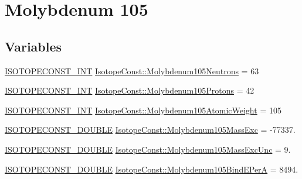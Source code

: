 \hypertarget{group___isotope_const-_molybdenum-_mo105}{}\section{Molybdenum 105}
\label{group___isotope_const-_molybdenum-_mo105}
\subsection*{Variables}
\begin{DoxyCompactItemize}
\item 
\mbox{\hyperlink{group___isotope_const-_macros_ga5f18360b3e99483a35c32d789e62621c}{I\+S\+O\+T\+O\+P\+E\+C\+O\+N\+S\+T\+\_\+\+I\+NT}} \mbox{\hyperlink{group___isotope_const-_molybdenum-_mo105_ga3ea2c4b0deecf579116e89594a15c6d9}{Isotope\+Const\+::\+Molybdenum105\+Neutrons}} = 63
\item 
\mbox{\hyperlink{group___isotope_const-_macros_ga5f18360b3e99483a35c32d789e62621c}{I\+S\+O\+T\+O\+P\+E\+C\+O\+N\+S\+T\+\_\+\+I\+NT}} \mbox{\hyperlink{group___isotope_const-_molybdenum-_mo105_ga86666d6ff3253ab33c90601b8abe2ebc}{Isotope\+Const\+::\+Molybdenum105\+Protons}} = 42
\item 
\mbox{\hyperlink{group___isotope_const-_macros_ga5f18360b3e99483a35c32d789e62621c}{I\+S\+O\+T\+O\+P\+E\+C\+O\+N\+S\+T\+\_\+\+I\+NT}} \mbox{\hyperlink{group___isotope_const-_molybdenum-_mo105_gab3e9d7db3d391be26681299f3b67ff0d}{Isotope\+Const\+::\+Molybdenum105\+Atomic\+Weight}} = 105
\item 
\mbox{\hyperlink{group___isotope_const-_macros_ga8f45a7272ce02c0b4c65c44636ed719a}{I\+S\+O\+T\+O\+P\+E\+C\+O\+N\+S\+T\+\_\+\+D\+O\+U\+B\+LE}} \mbox{\hyperlink{group___isotope_const-_molybdenum-_mo105_gad3b467cfc52f7b343b37881da8b0702d}{Isotope\+Const\+::\+Molybdenum105\+Mass\+Exc}} = -\/77337.
\item 
\mbox{\hyperlink{group___isotope_const-_macros_ga8f45a7272ce02c0b4c65c44636ed719a}{I\+S\+O\+T\+O\+P\+E\+C\+O\+N\+S\+T\+\_\+\+D\+O\+U\+B\+LE}} \mbox{\hyperlink{group___isotope_const-_molybdenum-_mo105_ga4b57e9947f1d64a21058060e2c7800e8}{Isotope\+Const\+::\+Molybdenum105\+Mass\+Exc\+Unc}} = 9.
\item 
\mbox{\hyperlink{group___isotope_const-_macros_ga8f45a7272ce02c0b4c65c44636ed719a}{I\+S\+O\+T\+O\+P\+E\+C\+O\+N\+S\+T\+\_\+\+D\+O\+U\+B\+LE}} \mbox{\hyperlink{group___isotope_const-_molybdenum-_mo105_gaf67e3b90991cdcbb587a39f0efc6b17d}{Isotope\+Const\+::\+Molybdenum105\+Bind\+E\+PerA}} = 8494.

\end{DoxyCompactItemize}
